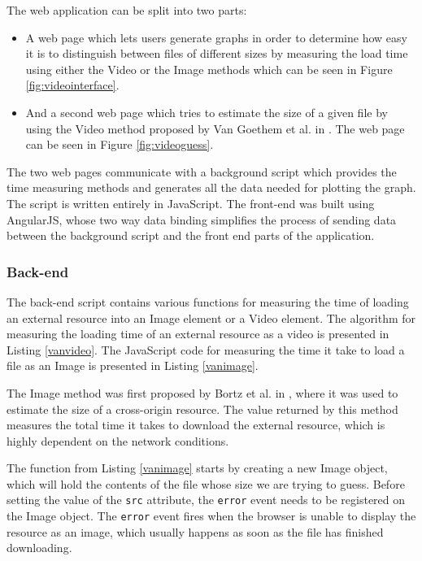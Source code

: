 \documentclass[10pt,a4paper,twoside]{book}
\begin{document}
The web application can be split into two parts:
\begin{itemize}
\item A web page which lets users generate graphs in order to determine how easy it is to distinguish between files of different sizes by measuring the load time using either the Video or the Image methods which can be seen in Figure \ref{fig:videointerface}.
\item And a second web page which tries to estimate the size of a given file by using the Video method proposed by Van Goethem et al. in \cite{van2015clock}. The web page can be seen in Figure \ref{fig:videoguess}.
\end{itemize}

The two web pages communicate with a background script which provides the time measuring methods and generates all the data needed for plotting the graph. The script is written entirely in JavaScript. The front-end was built using AngularJS, whose two way data binding simplifies the process of sending data between the background script and the front end parts of the application.

\subsubsection{Back-end}

The back-end script contains various functions for measuring the time of loading an external resource into an Image element or a Video element. The algorithm for measuring the loading time of an external resource as a video is presented in Listing \ref{vanvideo}. The JavaScript code for measuring the time it take to load a file as an Image is presented in Listing \ref{vanimage}.

The Image method was first proposed by Bortz et al. in \cite{bortz2007exposing}, where it was used to estimate the size of a cross-origin resource. The value returned by this method measures the total time it takes to download the external resource, which is highly dependent on the network conditions. 

The function from Listing \ref{vanimage} starts by creating a new Image object, which will hold the contents of the file whose size we are trying to guess. Before setting the value of the \texttt{src} attribute, the \texttt{error} event needs to be registered on the Image object. The \texttt{error} event fires when the browser is unable to display the resource as an image, which usually happens as soon as the file has finished downloading. 
\end{document}
